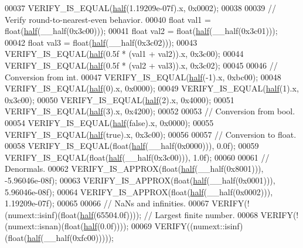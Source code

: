 \begin{DoxyCode}
00037   VERIFY\_IS\_EQUAL(\hyperlink{struct_eigen_1_1half}{half}(1.19209e-07f).x, 0x0002);
00038 
00039   \textcolor{comment}{// Verify round-to-nearest-even behavior.}
00040   \textcolor{keywordtype}{float} val1 = float(\hyperlink{struct_eigen_1_1half}{half}(\_\_half(0x3c00)));
00041   \textcolor{keywordtype}{float} val2 = float(\hyperlink{struct_eigen_1_1half}{half}(\_\_half(0x3c01)));
00042   \textcolor{keywordtype}{float} val3 = float(\hyperlink{struct_eigen_1_1half}{half}(\_\_half(0x3c02)));
00043   VERIFY\_IS\_EQUAL(\hyperlink{struct_eigen_1_1half}{half}(0.5f * (val1 + val2)).x, 0x3c00);
00044   VERIFY\_IS\_EQUAL(\hyperlink{struct_eigen_1_1half}{half}(0.5f * (val2 + val3)).x, 0x3c02);
00045 
00046   \textcolor{comment}{// Conversion from int.}
00047   VERIFY\_IS\_EQUAL(\hyperlink{struct_eigen_1_1half}{half}(-1).x, 0xbc00);
00048   VERIFY\_IS\_EQUAL(\hyperlink{struct_eigen_1_1half}{half}(0).x, 0x0000);
00049   VERIFY\_IS\_EQUAL(\hyperlink{struct_eigen_1_1half}{half}(1).x, 0x3c00);
00050   VERIFY\_IS\_EQUAL(\hyperlink{struct_eigen_1_1half}{half}(2).x, 0x4000);
00051   VERIFY\_IS\_EQUAL(\hyperlink{struct_eigen_1_1half}{half}(3).x, 0x4200);
00052 
00053   \textcolor{comment}{// Conversion from bool.}
00054   VERIFY\_IS\_EQUAL(\hyperlink{struct_eigen_1_1half}{half}(\textcolor{keyword}{false}).x, 0x0000);
00055   VERIFY\_IS\_EQUAL(\hyperlink{struct_eigen_1_1half}{half}(\textcolor{keyword}{true}).x, 0x3c00);
00056 
00057   \textcolor{comment}{// Conversion to float.}
00058   VERIFY\_IS\_EQUAL(\textcolor{keywordtype}{float}(\hyperlink{struct_eigen_1_1half}{half}(\_\_half(0x0000))), 0.0f);
00059   VERIFY\_IS\_EQUAL(\textcolor{keywordtype}{float}(\hyperlink{struct_eigen_1_1half}{half}(\_\_half(0x3c00))), 1.0f);
00060 
00061   \textcolor{comment}{// Denormals.}
00062   VERIFY\_IS\_APPROX(\textcolor{keywordtype}{float}(\hyperlink{struct_eigen_1_1half}{half}(\_\_half(0x8001))), -5.96046e-08f);
00063   VERIFY\_IS\_APPROX(\textcolor{keywordtype}{float}(\hyperlink{struct_eigen_1_1half}{half}(\_\_half(0x0001))), 5.96046e-08f);
00064   VERIFY\_IS\_APPROX(\textcolor{keywordtype}{float}(\hyperlink{struct_eigen_1_1half}{half}(\_\_half(0x0002))), 1.19209e-07f);
00065 
00066   \textcolor{comment}{// NaNs and infinities.}
00067   VERIFY(!(numext::isinf)(\textcolor{keywordtype}{float}(\hyperlink{struct_eigen_1_1half}{half}(65504.0f))));  \textcolor{comment}{// Largest finite number.}
00068   VERIFY(!(numext::isnan)(\textcolor{keywordtype}{float}(\hyperlink{struct_eigen_1_1half}{half}(0.0f))));
00069   VERIFY((numext::isinf)(\textcolor{keywordtype}{float}(\hyperlink{struct_eigen_1_1half}{half}(\_\_half(0xfc00)))));

\end{DoxyCode}
